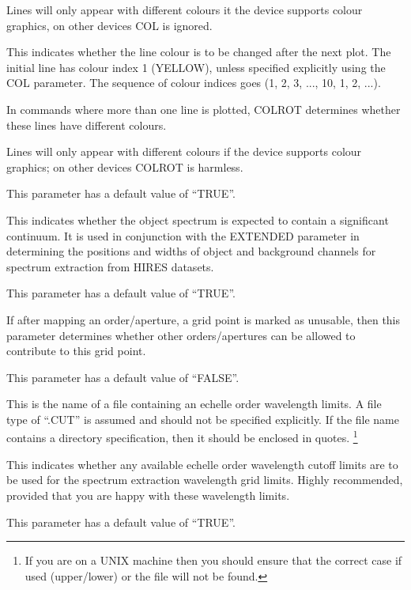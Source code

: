 \begin {description}
Lines will only appear with different colours it the device supports colour 
graphics, on other devices COL is ignored.

\item [COLROT=boolean]
This indicates whether the line colour is to be changed after the
next plot.
The initial line has colour index 1 (YELLOW), unless specified explicitly
using the COL parameter.
The sequence of colour indices goes (1, 2, 3, ..., 10, 1, 2, ...).

In commands where more than one line is plotted, COLROT determines
whether these lines have different colours.

Lines will only appear with different colours if the device supports
colour graphics; on other devices COLROT is harmless.

This parameter has a default value of ``TRUE''.

\item [CONTINUUM=boolean]
This indicates whether the object spectrum is expected to contain a
significant continuum.
It is used in conjunction with the EXTENDED parameter in determining
the positions and widths of object and background channels for
spectrum extraction from HIRES datasets.

This parameter has a default value of ``TRUE''.

\item [COVERGAP=boolean]
If after mapping an order/aperture, a grid point is marked as unusable,
then this parameter determines whether other orders/apertures
can be allowed to contribute to this grid point.

This parameter has a default value of ``FALSE''.

\item [CUTFILE=string]
This is the name of a file containing an echelle order
wavelength limits.
A file type of ``.CUT'' is assumed and should not be specified
explicitly.
If the file name contains a directory specification, then it should be
enclosed in quotes.
\footnote{If you are on a UNIX machine then you should ensure that the
correct case if used (upper/lower) or the file will not be found.}

\item [CUTWV=boolean]
This indicates whether any available echelle order wavelength cutoff
limits are to be used for the spectrum extraction wavelength grid
limits.
Highly recommended, provided that you are happy with these wavelength limits.

This parameter has a default value of ``TRUE''.


\end{description}
